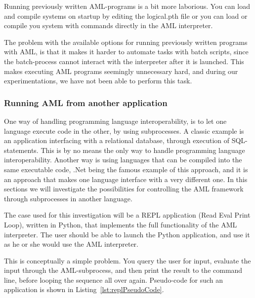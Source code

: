 
Running previously written AML-programs is a bit more laborious. You can load and compile systems on startup by editing the logical.pth file or you can load or compile you system with commands directly in the AML interpreter.

The problem with the available options for running previously written programs with AML, is that it makes it harder to automate tasks with batch scripts, since the batch-process cannot interact with the interpreter after it is launched. This makes executing AML programs seemingly unnecessary hard, and during our experimentations, we have not been able to perform this task.

\subsubsection{Running AML from another application} %
\label{ssub:running_aml_from_another_application}
One way of handling programming language interoperability, is to let one language execute code in the other, by using subprocesses. A classic example is an application interfacing with a relational database, through execution of SQL-statements. This is by no means the only way to handle programming language interoperability. Another way is using languages that can be compiled into the same executable code, .Net being the famous example of this approach, and it is an approach that makes one language interface with a very different one. In this sections we will investigate the possibilities for controlling the AML framework through subprocesses in another language.


The case used for this investigation will be a REPL application (Read Eval Print Loop), written in Python, that implements the full functionality of the AML interpreter. The user should be able to launch the Python application, and use it as he or she would use the AML interpreter.

This is conceptually a simple problem. You query the user for input, evaluate the input through the AML-subprocess, and then print the result to the command line, before looping the sequence all over again. Pseudo-code for such an application is shown in Listing~\ref{lst:replPseudoCode}.

